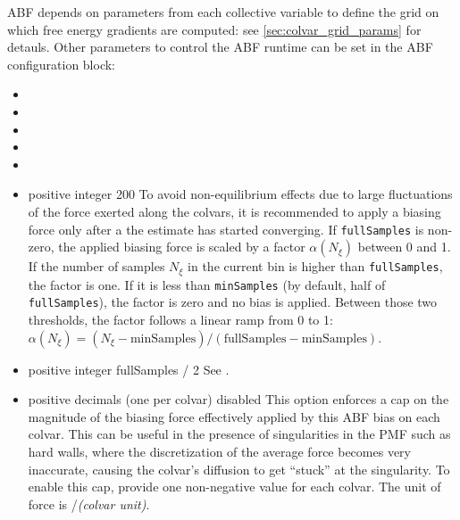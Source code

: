 
ABF depends on parameters from each collective variable to define the grid on which free energy gradients are computed: see \ref{sec:colvar_grid_params} for detauls.
Other parameters to control the ABF runtime can be set in the ABF configuration block:

\begin{itemize}

\item {}
\item {}
\item {}
\item {}
\item {}

\item %
  {positive integer}
  {200}
  {To avoid non-equilibrium effects due to large fluctuations of the force exerted along the
   colvars, it is recommended to apply a biasing force only after a the estimate has started
   converging. If \texttt{fullSamples} is non-zero, the applied biasing force is scaled by a factor
   $\alpha(N_\xi)$ between 0 and 1.
   If the number of samples $N_\xi$ in the current bin is higher than \texttt{fullSamples},
   the factor is one. If it is less than \texttt{minSamples} (by default, half of \texttt{fullSamples}),
   the factor is zero and no bias is applied.
   Between those two thresholds, the factor follows a linear ramp from
   0 to 1: $\alpha(N_\xi) = (N_\xi - \mathrm{minSamples}) / (\mathrm{fullSamples} - \mathrm{minSamples})$.}


\item {}
 {positive integer}
 {fullSamples / 2}
 {See .}


\item {}
  {positive decimals (one per colvar)}
  {disabled}
  {This option enforces a cap on the magnitude of the biasing force effectively applied
   by this ABF bias on each colvar. This can be useful in the presence of singularities
   in the PMF such as hard walls, where the discretization of the average force becomes
   very inaccurate, causing the colvar's diffusion to get ``stuck'' at the singularity.
   To enable this cap, provide one non-negative value for each colvar. The unit of force
   is \energyunit/\textit{(colvar unit)}.}


\end{itemize}

